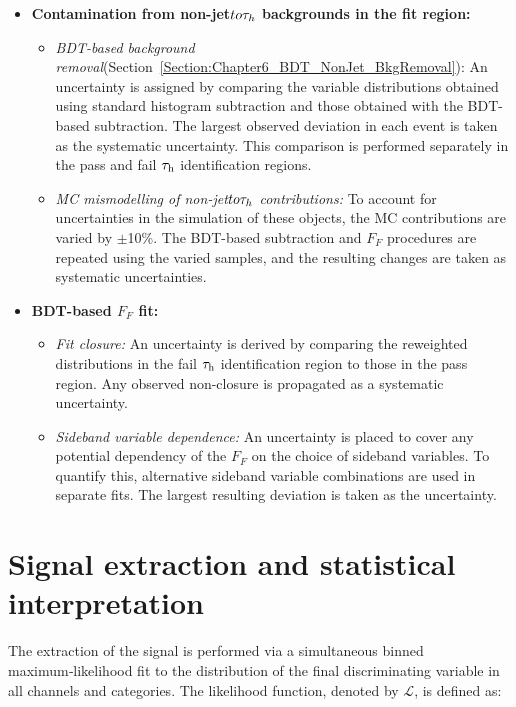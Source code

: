 \begin{itemize}
    \item \textbf{Contamination from non-jet$to\tau_h$ backgrounds in the fit region:}
    \begin{itemize}
        \item \textit{\ac{BDT}-based background removal}(Section~\ref{Section:Chapter6_BDT_NonJet_BkgRemoval}): An uncertainty is assigned by comparing the variable distributions obtained using standard histogram subtraction and those obtained with the \ac{BDT}-based subtraction. The largest observed deviation in each event is taken as the systematic uncertainty. This comparison is performed separately in the pass and fail $\tau_\mathrm{h}$ identification regions.
        \item \textit{\ac{MC} mismodelling of non-jet$to\tau_h$ contributions:} To account for uncertainties in the simulation of these objects, the \ac{MC} contributions are varied by $\pm$10\%. The \ac{BDT}-based subtraction and $F_F$ procedures are repeated using the varied samples, and the resulting changes are taken as systematic uncertainties.
    \end{itemize}

    \item \textbf{\ac{BDT}-based $F_F$ fit:}
    \begin{itemize}
        \item \textit{Fit closure:} An uncertainty is derived by comparing the reweighted distributions in the fail $\tau_\mathrm{h}$ identification region to those in the pass region. Any observed non-closure is propagated as a systematic uncertainty.
        \item \textit{Sideband variable dependence:} An uncertainty is placed to cover any potential dependency of the $F_F$ on the choice of sideband variables. To quantify this, alternative sideband variable combinations are used in separate fits. The largest resulting deviation is taken as the uncertainty.
    \end{itemize}
\end{itemize}

\section{Signal extraction and statistical interpretation}
\label{Section:Chapter6_SignalExtraction}

The extraction of the signal is performed via a simultaneous binned maximum‑likelihood fit to the distribution of the final discriminating variable in all channels and categories. The likelihood function, denoted by $\mathscr{L}$, is defined as:

